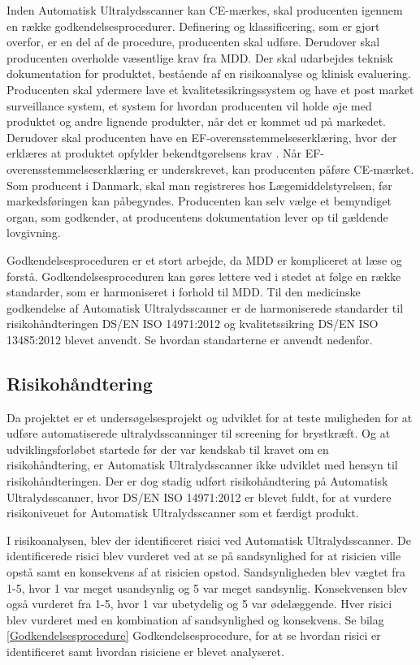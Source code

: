 Inden Automatisk Ultralydsscanner kan CE-mærkes, skal producenten igennem en række godkendelsesprocedurer. Definering og klassificering, som er gjort overfor, er en del af de procedure, producenten skal udføre. Derudover skal producenten overholde væsentlige krav fra MDD. Der skal udarbejdes teknisk dokumentation for produktet, bestående af en risikoanalyse og klinisk evaluering. Producenten skal ydermere lave et kvalitetssikringssystem og have et post market surveillance system, et system for hvordan producenten vil holde øje med produktet og andre lignende produkter, når det er kommet ud på markedet. Derudover skal producenten have en EF-overensstemmelseserklæring, hvor der  erklæres at produktet opfylder bekendtgørelsens krav \cite{Vej}. Når EF-overensstemmelseserklæring er underskrevet, kan producenten påføre CE-mærket. Som producent i Danmark, skal man registreres hos Lægemiddelstyrelsen, før markedsføringen kan påbegyndes. Producenten kan selv vælge et bemyndiget organ, som godkender, at producentens dokumentation lever op til gældende lovgivning. \cite{Klasse} 

Godkendelsesproceduren er et stort arbejde, da MDD er kompliceret at læse og forstå. Godkendelsesproceduren kan gøres lettere ved i stedet at følge en række standarder, som er harmoniseret i forhold til MDD. Til den medicinske godkendelse af Automatisk Ultralydsscanner er de harmoniserede standarder til risikohåndteringen DS/EN ISO 14971:2012 \cite{14971} og kvalitetssikring DS/EN ISO 13485:2012 \cite{13485} blevet anvendt. Se hvordan standarterne er anvendt nedenfor. 

\subsection{Risikohåndtering}
Da projektet er et undersøgelsesprojekt og udviklet for at teste muligheden for at udføre automatiserede ultralydsscanninger til screening for brystkræft. Og at udviklingsforløbet startede før der var kendskab til kravet om en risikohåndtering, er Automatisk Ultralydsscanner ikke udviklet med hensyn til risikohåndteringen. Der er dog stadig udført risikohåndtering på Automatisk Ultralydsscanner, hvor DS/EN ISO 14971:2012 \cite{14971} er blevet fuldt, for at vurdere risikoniveuet for Automatisk Ultralydsscanner som et færdigt produkt. 

I risikoanalysen, blev der identificeret risici ved Automatisk Ultralydsscanner. De identificerede risici blev vurderet ved at se på sandsynlighed for at risicien ville opstå samt en konsekvens af at risicien opstod. Sandsynligheden blev vægtet fra 1-5, hvor 1 var meget usandsynlig og 5 var meget sandsynlig. Konsekvensen blev også vurderet fra 1-5, hvor 1 var ubetydelig og 5 var ødelæggende. Hver risici blev vurderet med en kombination af sandsynlighed og konsekvens. Se bilag \ref{Godkendelsesprocedure} Godkendelsesprocedure, for at se hvordan risici er identificeret samt hvordan risiciene er blevet analyseret. 

